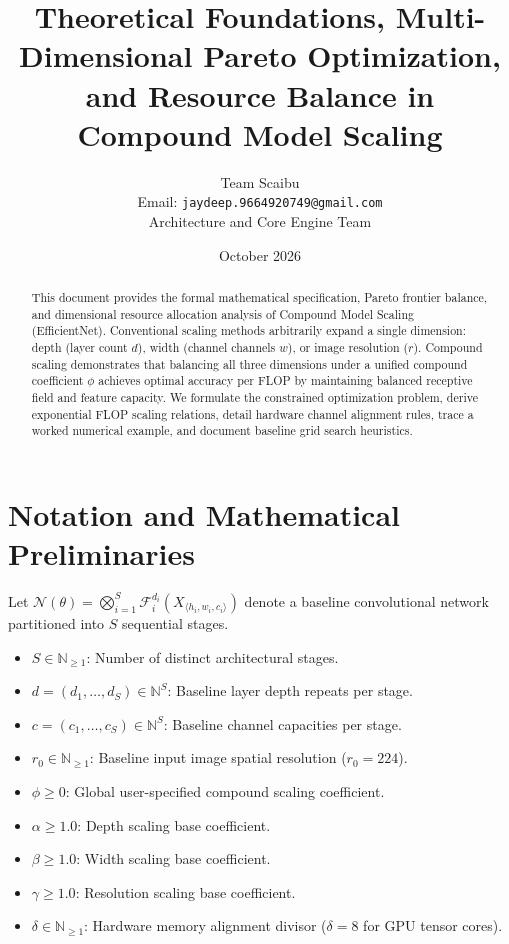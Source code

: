 \documentclass[11pt,a4paper]{article}
\title{\textbf{Theoretical Foundations, Multi-Dimensional Pareto Optimization, and Resource Balance in Compound Model Scaling}}
\author{Team Scaibu \\ \small Email: \texttt{jaydeep.9664920749@gmail.com} \\ \small Architecture and Core Engine Team}
\date{October 2026}
\theoremstyle{definition}
\begin{document}
\maketitle

\begin{abstract}
This document provides the formal mathematical specification, Pareto frontier balance, and dimensional resource allocation analysis of Compound Model Scaling (EfficientNet). Conventional scaling methods arbitrarily expand a single dimension: depth (layer count $d$), width (channel channels $w$), or image resolution ($r$). Compound scaling demonstrates that balancing all three dimensions under a unified compound coefficient $\phi$ achieves optimal accuracy per FLOP by maintaining balanced receptive field and feature capacity. We formulate the constrained optimization problem, derive exponential FLOP scaling relations, detail hardware channel alignment rules, trace a worked numerical example, and document baseline grid search heuristics.
\end{abstract}

\section{Notation and Mathematical Preliminaries}

Let $\mathcal{N}(\theta) = \bigotimes_{i=1}^S \mathcal{F}_i^{d_i}(X_{\langle h_i, w_i, c_i \rangle})$ denote a baseline convolutional network partitioned into $S$ sequential stages.

\begin{itemize}
    \item $S \in \mathbb{N}_{\ge 1}$: Number of distinct architectural stages.
    \item $d = (d_1, \dots, d_S) \in \mathbb{N}^S$: Baseline layer depth repeats per stage.
    \item $c = (c_1, \dots, c_S) \in \mathbb{N}^S$: Baseline channel capacities per stage.
    \item $r_0 \in \mathbb{N}_{\ge 1}$: Baseline input image spatial resolution ($r_0 = 224$).
    \item $\phi \ge 0$: Global user-specified compound scaling coefficient.
    \item $\alpha \ge 1.0$: Depth scaling base coefficient.
    \item $\beta \ge 1.0$: Width scaling base coefficient.
    \item $\gamma \ge 1.0$: Resolution scaling base coefficient.
    \item $\delta \in \mathbb{N}_{\ge 1}$: Hardware memory alignment divisor ($\delta = 8$ for GPU tensor cores).
\end{itemize}
\end{document}
